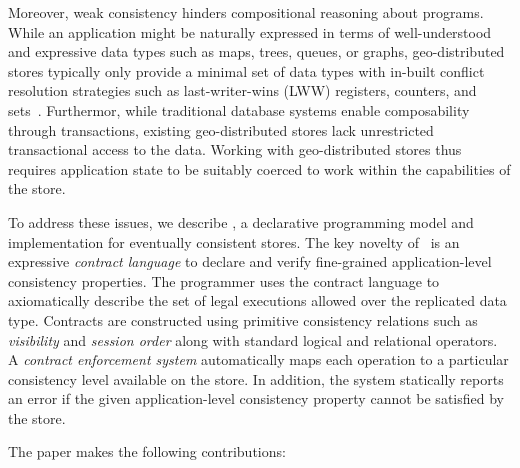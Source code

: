 Moreover, weak consistency hinders compositional reasoning about programs.
While an application might be naturally expressed in terms of
well-understood and expressive data types such as maps, trees, queues, or
graphs, geo-distributed stores typically only provide a minimal set of data
types with in-built conflict resolution strategies such as last-writer-wins
(LWW) registers, counters, and sets~\cite{Cassandra,DynamoDB}.  Furthermor,
while traditional database systems enable composability through
transactions, existing geo-distributed stores lack unrestricted
transactional access to the data.  Working with geo-distributed stores thus
requires application state to be suitably coerced to work within the
capabilities of the store.

To address these issues, we describe \name, a declarative programming model
and implementation for eventually consistent stores. The key novelty of
\name\ is an expressive \emph{contract language} to declare and verify
fine-grained application-level consistency properties.  The programmer uses
the contract language to axiomatically describe the set of legal executions
allowed over the replicated data type.  Contracts are constructed using
primitive consistency relations such as \emph{visibility} and \emph{session
  order} along with standard logical and relational operators.  A
\emph{contract enforcement system} automatically maps each operation to a
particular consistency level available on the store.  In addition, the
system statically reports an error if the given application-level
consistency property cannot be satisfied by the store.  

The paper makes the following contributions:

